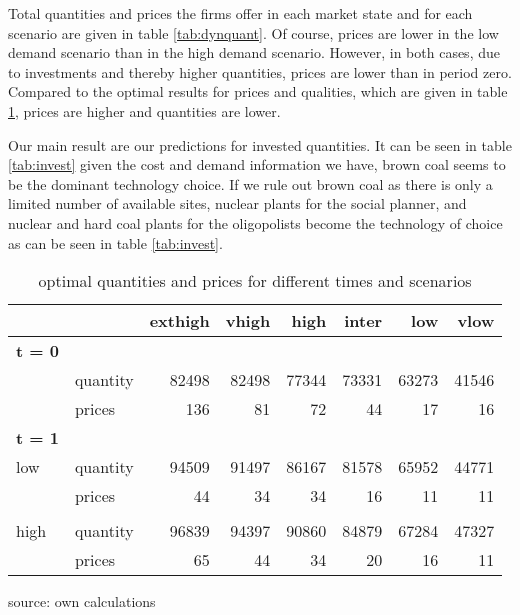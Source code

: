 \begin{table}
\centering

Total quantities and prices the firms offer in each market state and for each scenario are given in table \ref{tab:dynquant}. Of course, prices are lower in the low demand scenario than in the high demand scenario. However, in both cases, due to investments and thereby higher quantities, prices are lower than in period zero.
Compared to the optimal results for prices and qualities, which are given in table \ref{tab:dynquantopt}, prices are higher and quantities are lower.

Our main result are our predictions for invested quantities. It can be seen in table \ref{tab:invest} given the cost and demand information we have, brown coal seems to be the dominant technology choice. If we rule out brown coal as there is only a limited number of available sites, nuclear plants for the social planner, and nuclear and hard coal plants for the oligopolists become the technology of choice as can be seen in table \ref{tab:invest}.

\begin{tabular}{llrrrrrr}
\hline
\hline
           &            &    exthigh &      vhigh &       high &      inter &        low &       vlow \\
\hline
{\bf t = 0} &            &            &            &            &            &            &            \\
\hline
           &   quantity &      82498 &      82498 &      77344 &      73331 &      63273 &      41546 \\

           &     prices &        136 &         81 &         72 &         44 &         17 &         16 \\
\hline
{\bf t = 1} &            &            &            &            &            &            &            \\
\hline
       low &   quantity &      94509 &      91497 &      86167 &      81578 &      65952 &      44771 \\

           &     prices &         44 &         34 &         34 &         16 &         11 &         11 \\

           &            &            &            &            &            &            &            \\

      high &   quantity &      96839 &      94397 &      90860 &      84879 &      67284 &      47327 \\

           &     prices &         65 &         44 &         34 &         20 &         16 &         11 \\
\hline
\hline
\end{tabular}  
 

\label{tab:dynquantopt}
\caption{optimal quantities and prices for different times and scenarios}
\begin{center}
source: own calculations
\end{center}
\end{table}

